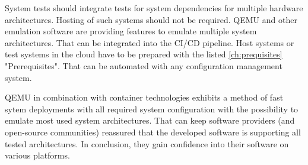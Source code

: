 System tests should integrate tests for system dependencies for multiple hardware architectures. Hosting of such systems should not be required. \gls{QEMU} and other emulation software are providing features to emulate multiple system architectures.
That can be integrated into the \gls{CI/CD} pipeline. Host systems or test systems in the cloud have to be prepared with the listed \ref{ch:prequisites} "Prerequisites". That can be automated with any configuration management system.

\gls{QEMU} in combination with container technologies exhibits a method of fast sytem deployments with all required system configuration with the possibility to emulate most used system architectures. That can keep software providers (and open-source communities) reassured that the developed software is supporting all tested architectures. 
In conclusion, they gain confidence into their software on various platforms.